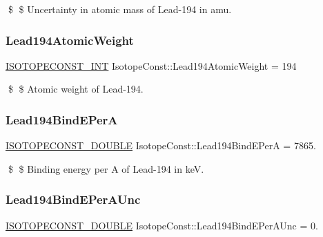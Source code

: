 \$ \$ Uncertainty in atomic mass of Lead-\/194 in amu. \mbox{\label{group___isotope_const-_lead-_pb194_gafec8587a3529e940827c1e682a13d2f1}} 
\subsubsection{\texorpdfstring{Lead194\+Atomic\+Weight}{Lead194AtomicWeight}}
{\footnotesize\ttfamily \mbox{\hyperlink{group___isotope_const-_macros_ga5f18360b3e99483a35c32d789e62621c}{I\+S\+O\+T\+O\+P\+E\+C\+O\+N\+S\+T\+\_\+\+I\+NT}} Isotope\+Const\+::\+Lead194\+Atomic\+Weight = 194}

\$ \$ Atomic weight of Lead-\/194. \mbox{\label{group___isotope_const-_lead-_pb194_gabbd647516c062c37589f200d47642aba}} 
\subsubsection{\texorpdfstring{Lead194\+Bind\+E\+PerA}{Lead194BindEPerA}}
{\footnotesize\ttfamily \mbox{\hyperlink{group___isotope_const-_macros_ga8f45a7272ce02c0b4c65c44636ed719a}{I\+S\+O\+T\+O\+P\+E\+C\+O\+N\+S\+T\+\_\+\+D\+O\+U\+B\+LE}} Isotope\+Const\+::\+Lead194\+Bind\+E\+PerA = 7865.}

\$ \$ Binding energy per A of Lead-\/194 in keV. \mbox{\label{group___isotope_const-_lead-_pb194_ga172cbac03b013617d1c65d1f642fa620}} 
\subsubsection{\texorpdfstring{Lead194\+Bind\+E\+Per\+A\+Unc}{Lead194BindEPerAUnc}}
{\footnotesize\ttfamily \mbox{\hyperlink{group___isotope_const-_macros_ga8f45a7272ce02c0b4c65c44636ed719a}{I\+S\+O\+T\+O\+P\+E\+C\+O\+N\+S\+T\+\_\+\+D\+O\+U\+B\+LE}} Isotope\+Const\+::\+Lead194\+Bind\+E\+Per\+A\+Unc = 0.}

